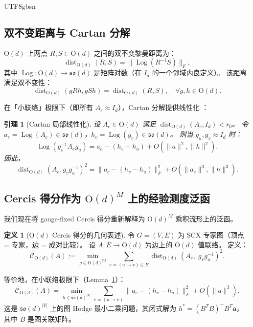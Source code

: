\documentclass[12pt,a4paper]{article}
\theoremstyle{plain}
\newtheorem{lemma}[theorem]{引理}
\theoremstyle{definition}
\newtheorem{definition}[theorem]{定义}
\theoremstyle{remark}
\newcommand{\Od}{\mathrm{O}(d)}
\newcommand{\sod}{\mathfrak{so}(d)}
\newcommand{\grph}{G}
\newcommand{\cercis}{\mathcal{C}}
\DeclareMathOperator{\dist}{dist}
\DeclareMathOperator{\Log}{Log}
\begin{document}
\begin{CJK}{UTF8}{gbsn}
\subsection{双不变距离与 Cartan 分解}

$\Od$ 上两点 $R, S \in \Od$ 之间的双不变黎曼距离为：
\begin{equation}\label{eq:dist_od}
    \dist_{\Od}(R, S) = \|\Log(R^{-1} S)\|_F,
\end{equation}
其中 $\Log: \Od \to \sod$ 是矩阵对数（在 $I_d$ 的一个邻域内良定义）。
该距离满足双不变性：
\begin{equation}
    \dist_{\Od}(g R h, g S h) = \dist_{\Od}(R, S), \quad \forall g, h \in \Od.
\end{equation}

在「小联络」极限下（即所有 $A_e \approx I_d$），Cartan 分解提供线性化 \cite{scx_gauge}：
\begin{lemma}[Cartan 局部线性化]\label{lem:cartan}
设 $A_e \in \Od$ 满足 $\dist_{\Od}(A_e, I_d) < r_0$。
令 $a_e = \Log(A_e) \in \sod$，$h_v = \Log(g_v) \in \sod$。
则当 $g_u, g_v \approx I_d$ 时：
\begin{equation}
    \Log(g_v^{-1} A_e g_u) = a_e - (h_v - h_u) + O(\|a\|^2, \|h\|^2).
\end{equation}
因此，
\begin{equation}
    \dist_{\Od}(A_e, g_v g_u^{-1})^2 = \|a_e - (h_v - h_u)\|_F^2 + O(\|a_e\|^3, \|h\|^3).
\end{equation}
\end{lemma}

\subsection{Cercis 得分作为 $\Od^M$ 上的经验测度泛函}

我们现在将 gauge-fixed Cercis 得分重新解释为 $\Od^M$ 乘积流形上的泛函。

\begin{definition}[$\Od$ Cercis 得分的几何表述]\label{def:cercis_geo}
令 $\grph = (V, E)$ 为 SCX 专家图（顶点 = 专家，边 = 成对比较）。
设 $A: E \to \Od$ 为边上的 $\Od$ 值联络。
定义：
\begin{equation}
    \cercis_{\Od}(A) := \min_{g \in \Od^{|V|}} \sum_{e = (u \to v) \in E} \dist_{\Od}(A_e,\; g_v g_u^{-1})^2.
\end{equation}

等价地，在小联络极限下（Lemma~\ref{lem:cartan}）：
\begin{equation}
    \cercis_{\Od}(A) = \min_{h \in \sod^{|V|}} \sum_{e = (u \to v)} \|a_e - (h_v - h_u)\|_F^2 + O(\|a\|^3).
\end{equation}
这是 $\sod^{|V|}$ 上的图 Hodge 最小二乘问题，其闭式解为 $h^* = (B^T B)^+ B^T \mathbf{a}$，
其中 $B$ 是图关联矩阵。
\end{definition}


\end{CJK}
\end{document}
